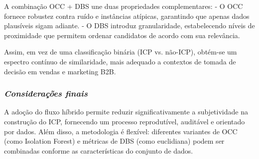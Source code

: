 A combinação OCC + DBS une duas propriedades complementares:  
- O OCC fornece robustez contra ruído e instâncias atípicas, garantindo
que apenas dados plausíveis sigam adiante.  
- O DBS introduz granularidade, estabelecendo níveis de proximidade que
permitem ordenar candidatos de acordo com sua relevância.

Assim, em vez de uma classificação binária (ICP vs. não-ICP), obtém-se
um espectro contínuo de similaridade, mais adequado a contextos de
tomada de decisão em vendas e marketing B2B.

\subsubsection{\textit{Considerações finais}}

A adoção do fluxo híbrido permite reduzir significativamente a
subjetividade na construção do ICP, fornecendo um processo reprodutível,
auditável e orientado por dados. Além disso, a metodologia é flexível:
diferentes variantes de OCC (como Isolation Forest) e métricas
de DBS (como euclidiana) podem ser combinadas conforme as
características do conjunto de dados.
